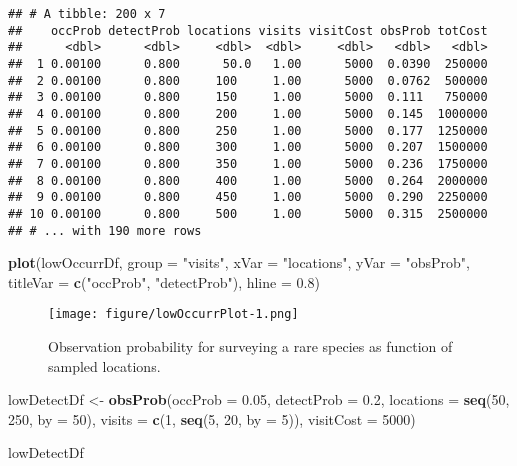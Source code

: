 \documentclass[]{article}
\newenvironment{Shaded}{\begin{snugshade}}{\end{snugshade}}
\newcommand{\KeywordTok}[1]{\textcolor[rgb]{0.13,0.29,0.53}{\textbf{#1}}}
\newcommand{\DataTypeTok}[1]{\textcolor[rgb]{0.13,0.29,0.53}{#1}}
\newcommand{\DecValTok}[1]{\textcolor[rgb]{0.00,0.00,0.81}{#1}}
\newcommand{\FloatTok}[1]{\textcolor[rgb]{0.00,0.00,0.81}{#1}}
\newcommand{\StringTok}[1]{\textcolor[rgb]{0.31,0.60,0.02}{#1}}
\newcommand{\NormalTok}[1]{#1}
\begin{document}
\begin{verbatim}
## # A tibble: 200 x 7
##    occProb detectProb locations visits visitCost obsProb totCost
##      <dbl>      <dbl>     <dbl>  <dbl>     <dbl>   <dbl>   <dbl>
##  1 0.00100      0.800      50.0   1.00      5000  0.0390  250000
##  2 0.00100      0.800     100     1.00      5000  0.0762  500000
##  3 0.00100      0.800     150     1.00      5000  0.111   750000
##  4 0.00100      0.800     200     1.00      5000  0.145  1000000
##  5 0.00100      0.800     250     1.00      5000  0.177  1250000
##  6 0.00100      0.800     300     1.00      5000  0.207  1500000
##  7 0.00100      0.800     350     1.00      5000  0.236  1750000
##  8 0.00100      0.800     400     1.00      5000  0.264  2000000
##  9 0.00100      0.800     450     1.00      5000  0.290  2250000
## 10 0.00100      0.800     500     1.00      5000  0.315  2500000
## # ... with 190 more rows
\end{verbatim}

\begin{Shaded}
\begin{Highlighting}[]
\KeywordTok{plot}\NormalTok{(lowOccurrDf, }\DataTypeTok{group =} \StringTok{"visits"}\NormalTok{, }\DataTypeTok{xVar =} \StringTok{"locations"}\NormalTok{, }\DataTypeTok{yVar =} \StringTok{"obsProb"}\NormalTok{, }\DataTypeTok{titleVar =} \KeywordTok{c}\NormalTok{(}\StringTok{"occProb"}\NormalTok{, }
    \StringTok{"detectProb"}\NormalTok{), }\DataTypeTok{hline =} \FloatTok{0.8}\NormalTok{)}
\end{Highlighting}
\end{Shaded}

\begin{figure}
\centering
\texttt{[image: figure/lowOccurrPlot-1.png]}
\caption{Observation probability for surveying a rare species as
function of sampled locations. \label{lowOccurrPlot}}
\end{figure}

\begin{Shaded}
\begin{Highlighting}[]
\NormalTok{lowDetectDf <-}\StringTok{ }\KeywordTok{obsProb}\NormalTok{(}\DataTypeTok{occProb =} \FloatTok{0.05}\NormalTok{, }\DataTypeTok{detectProb =} \FloatTok{0.2}\NormalTok{, }\DataTypeTok{locations =} \KeywordTok{seq}\NormalTok{(}\DecValTok{50}\NormalTok{, }
    \DecValTok{250}\NormalTok{, }\DataTypeTok{by =} \DecValTok{50}\NormalTok{), }\DataTypeTok{visits =} \KeywordTok{c}\NormalTok{(}\DecValTok{1}\NormalTok{, }\KeywordTok{seq}\NormalTok{(}\DecValTok{5}\NormalTok{, }\DecValTok{20}\NormalTok{, }\DataTypeTok{by =} \DecValTok{5}\NormalTok{)), }\DataTypeTok{visitCost =} \DecValTok{5000}\NormalTok{)}

\NormalTok{lowDetectDf}
\end{Highlighting}
\end{Shaded}
\end{document}
